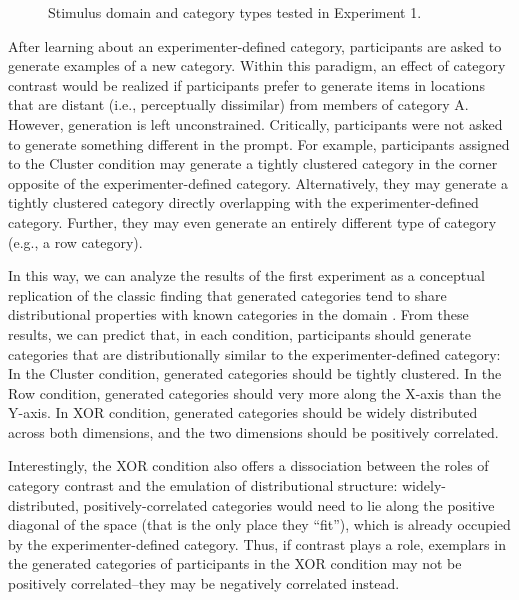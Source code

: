 \documentclass[12pt]{article}
\newcommand\inputpgf[2]{{
\let\pgfimageWithoutPath\pgfimage
\renewcommand{\pgfimage}[2][]{\pgfimageWithoutPath[##1]{#1/##2}}

}}
\begin{document}
\begin{flushleft}
\begin{figure}
    \begin{center}
    \inputpgf{figs/}{e1-conditions.pgf}
    \caption{Stimulus domain and category types tested in Experiment 1. }
    \label{fig:e1-conditions}
    \end{center}
\end{figure}

After learning about an experimenter-defined category, participants are asked to generate examples of a new category. Within this paradigm, an effect of category contrast would be realized if participants prefer to generate items in locations that are distant (i.e., perceptually dissimilar) from members of category A. However, generation is left unconstrained. Critically, participants were not asked to generate something different in the prompt. For example, participants assigned to the Cluster condition may generate a tightly clustered category in the corner opposite of the experimenter-defined category. Alternatively, they may generate a tightly clustered category directly overlapping with the experimenter-defined category. Further, they may even generate an entirely different type of category (e.g., a row category). 

In this way, we can analyze the results of the first experiment as a conceptual replication of the classic finding that generated categories tend to share distributional properties with known categories in the domain \citep[see][]{jern2013probabilistic,ward1994structured}. From these results, we can predict that, in each condition, participants should generate categories that are distributionally similar to the experimenter-defined category: In the Cluster condition, generated categories should be tightly clustered. In the Row condition, generated categories should very more along the X-axis than the Y-axis. In XOR condition, generated categories should be widely distributed across both dimensions, and the two dimensions should be positively correlated. 

Interestingly, the XOR condition also offers a dissociation between the roles of category contrast and the emulation of distributional structure: widely-distributed, positively-correlated categories would need to lie along the positive diagonal of the space (that is the only place they ``fit''), which is already occupied by the experimenter-defined category. Thus, if contrast plays a role, exemplars in the generated categories of participants in the XOR condition may not be positively correlated--they may be negatively correlated instead.



\end{flushleft}
\end{document}
